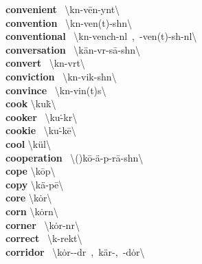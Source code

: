 \documentclass[10pt,a4paper]{article}
\begin{document}
\begin{multicols}{2}
\textbf{ convenient }\quad \ \textbackslash k\textschwa n-\textprimstress v\={e}n-y\textschwa nt\textbackslash \\
\textbf{ convention }\quad \ \textbackslash k\textschwa n-\textprimstress ven(t)-sh\textschwa n\textbackslash \\
\textbf{ conventional }\quad \ \textbackslash k\textschwa n-\textprimstress vench-n\textschwa l\ ,\ -\textprimstress ven(t)-sh\textschwa -n\textsuperscript{\textreve}l\textbackslash \\
\textbf{ conversation }\quad \ \textbackslash \textsecstress k\"{a}n-v\textschwa r-\textprimstress s\={a}-sh\textschwa n\textbackslash \\
\textbf{ convert }\quad \ \textbackslash k\textschwa n-\textprimstress v\textschwa rt\textbackslash \\
\textbf{ conviction }\quad \ \textbackslash k\textschwa n-\textprimstress vik-sh\textschwa n\textbackslash \\
\textbf{ convince }\quad \ \textbackslash k\textschwa n-\textprimstress vin(t)s\textbackslash \\
\textbf{ cook }\quad \textbackslash \textprimstress ku\. k\textbackslash \\
\textbf{ cooker }\quad \ \textbackslash \textprimstress ku\. -k\textschwa r\textbackslash \\
\textbf{ cookie }\quad \ \textbackslash \textprimstress ku\. -k\={e}\textbackslash \\
\textbf{ cool }\quad \textbackslash \textprimstress k\"{u}l\textbackslash \\
\textbf{ cooperation }\quad \ \textbackslash (\textsecstress )k\={o}-\textsecstress \"{a}-p\textschwa -\textprimstress r\={a}-sh\textschwa n\textbackslash \\
\textbf{ cope }\quad \textbackslash \textprimstress k\={o}p\textbackslash \\
\textbf{ copy }\quad \textbackslash \textprimstress k\"{a}-p\={e}\textbackslash \\
\textbf{ core }\quad \textbackslash \textprimstress k\.{o}r\textbackslash \\
\textbf{ corn }\quad \textbackslash \textprimstress k\.{o}rn\textbackslash \\
\textbf{ corner }\quad \ \textbackslash \textprimstress k\.{o}r-n\textschwa r\textbackslash \\
\textbf{ correct }\quad \ \textbackslash k\textschwa -\textprimstress rekt\textbackslash \\
\textbf{ corridor }\quad \ \textbackslash \textprimstress k\.{o}r-\textschwa -d\textschwa r\ ,\ \textprimstress k\"{a}r-,\ -\textsecstress d\.{o}r\textbackslash \\

\end{multicols}
\end{document}
